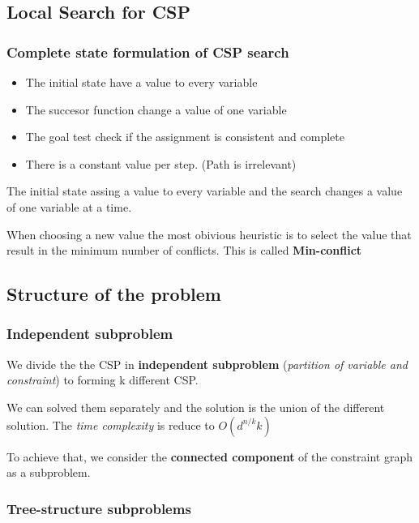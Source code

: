 \subsection{Local Search for CSP}

\subsubsection{Complete state formulation of CSP search }
\begin{itemize}
	\item The initial state have a value to every variable
	\item The succesor function change a value of one variable
	\item The goal test check if the assignment is consistent and complete
	\item There is a constant value per step. (Path is irrelevant)
\end{itemize}


The  initial state  assing  a value  to every  variable  and the  search
changes a value of one variable at a time.

When choosing a  new value the most obivious heuristic  is to select the
value that  result in the  minimum number  of conflicts. This  is called
\textbf{Min-conflict}

\subsection{Structure of the problem}

\subsubsection{Independent subproblem}

We   divide    the   the   CSP   in    \textbf{independent   subproblem}
(\textit{partition of  variable and constraint}) to  forming k different
CSP.

We can solved them separately and the solution is the union of the different
solution. The \textit{time complexity} is reduce to $O(d^{n/k} k)$

To achieve that, we consider  the \textbf{connected component} of
the constraint graph as a subproblem.

\subsubsection{Tree-structure subproblems}

